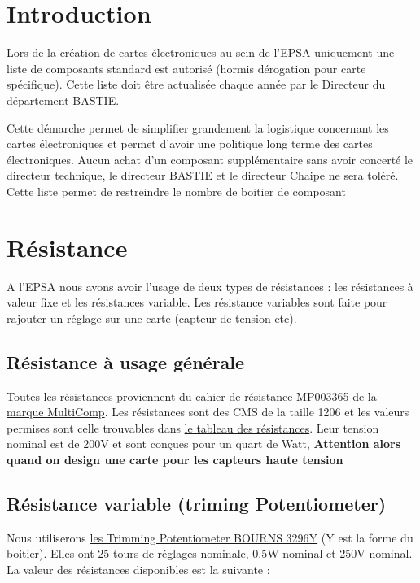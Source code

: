 \documentclass{EPSA-rap-template}
\begin{document}
\fairepagedegarde
\newpage
\tableofcontents

\newpage

\section{Introduction}

Lors de la création de cartes électroniques au sein de l'EPSA uniquement une liste de composants standard est autorisé (hormis dérogation pour carte spécifique). Cette liste doit être actualisée chaque année par le Directeur du département BASTIE.

Cette démarche permet de simplifier grandement la logistique concernant les cartes électroniques et permet d'avoir une politique long terme des cartes électroniques. Aucun achat d'un composant supplémentaire sans avoir concerté le directeur technique, le directeur BASTIE et le directeur Chaipe ne sera toléré. Cette liste permet de restreindre le nombre de boitier de composant

\section{Résistance}

A l'EPSA nous avons avoir l'usage de deux types de résistances : les résistances à valeur fixe et les résistances variable. Les résistance variables sont faite pour rajouter un réglage sur une carte (capteur de tension etc).

\subsection{Résistance à usage générale}

Toutes les résistances proviennent du cahier de résistance \href{https://fr.farnell.com/multicomp-pro/mp003365/kit-resi-0r-1m-0-25w-1-1206-9900pc/dp/3405258}{ MP003365  de la marque MultiComp}. Les résistances sont des CMS de la taille 1206 et les valeurs permises sont celle trouvables dans \hyperlink{ResTab}{le tableau des résistances}. Leur tension nominal est de 200V et sont conçues pour un quart de Watt, \textbf{Attention alors quand on design une carte pour les capteurs haute tension}

\subsection{Résistance variable (triming Potentiometer)}

Nous utiliserons \hyperlink{DataSheetTrim}{les Trimming Potentiometer BOURNS 3296Y} (Y est la forme du boitier). Elles ont 25 tours de réglages nominale, 0.5W nominal et 250V nominal. La valeur des résistances disponibles est la suivante :
\end{document}
